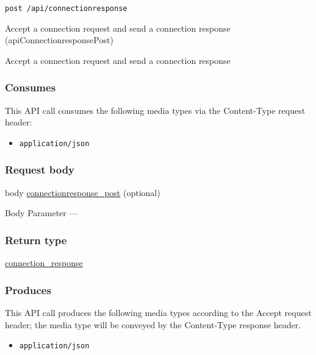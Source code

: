 \protect\hypertarget{apiConnectionresponsePost}{}{}

\begin{verbatim}
post /api/connectionresponse
\end{verbatim}

Accept a connection request and send a connection response
({apiConnectionresponsePost})

Accept a connection request and send a connection response

\hypertarget{consumes-1}{%
\subsubsection{Consumes}\label{consumes-1}}

This API call consumes the following media types via the {Content-Type}
request header:

\begin{itemize}
\tightlist
\item
  \texttt{application/json}
\end{itemize}

\hypertarget{request-body-1}{%
\subsubsection{Request body}\label{request-body-1}}

body
\protect\hyperlink{connectionresponse_post}{connectionresponse\_post}
(optional)

{Body Parameter} ---

\hypertarget{return-type-4}{%
\subsubsection{Return type}\label{return-type-4}}

\protect\hyperlink{connection_response}{connection\_response}

\hypertarget{produces-6}{%
\subsubsection{Produces}\label{produces-6}}

This API call produces the following media types according to the
{Accept} request header; the media type will be conveyed by the
{Content-Type} response header.

\begin{itemize}
\tightlist
\item
  \texttt{application/json}
\end{itemize}

